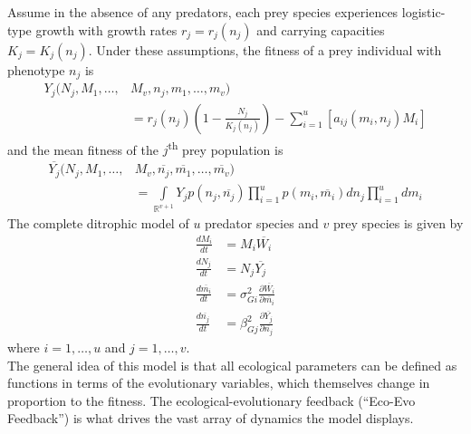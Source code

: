 \documentclass{amsart}
\theoremstyle{definition}
\theoremstyle{remark}
\numberwithin{equation}{section}
\begin{document}
Assume in the absence of any predators, each prey species experiences logistic-type growth with growth rates $r_j = r_j(n_j)$ and carrying capacities $K_j = K_j(n_j)$.  Under these assumptions, the fitness of a prey individual with phenotype $n_j$ is
\begin{equation}
	\label{prey_fitness}
	\begin{aligned}
		Y_j(N_j, M_1, \dots, &M_v, n_j, m_1, \dots, m_v) \\
		&= r_j(n_j)\left(1 - \frac{N_j}{K_j(n_j)}\right) - \sum\limits_{i = 1}^{u}\left[a_{ij}(m_i, n_j)M_i\right]
	\end{aligned}
\end{equation}
and the mean fitness of the $j$\textsuperscript{th} prey population is
\begin{equation}
	\label{avg_prey_fitness}
	\begin{aligned}
		\overline{Y_j}(N_j, M_1, \dots, &M_v, \overline{n_j}, \overline{m_1}, \dots, \overline{m_v}) \\
		&= \int\limits_{\mathbb{R}^{v+1}}^{}Y_jp(n_j, \overline{n_j})\prod\limits_{i = 1}^{u}p(m_i, \overline{m_i})dn_j\prod\limits_{i = 1}^{u}dm_i
	\end{aligned}
\end{equation}
The complete ditrophic model of $u$ predator species and $v$ prey species is given by
\begin{subequations}
	\label{general_model}
	\begin{align}
		\label{eq:general_model_a}
		\frac{dM_i}{dt} &= M_i\overline{W_i} \\[5px]
		\label{eq:general_model_b}
		\frac{dN_j}{dt} &= N_j\overline{Y_j} \\[5px]
		\label{eq:general_model_c}
		\frac{d\overline{m_i}}{dt} &= \sigma_{Gi}^2\frac{\partial \overline{W_i}}{\partial \overline{m_i}} \\[5px]
		\label{eq:general_model_d} 
		\frac{d\overline{n_j}}{dt} &= \beta_{Gj}^2\frac{\partial \overline{Y_j}}{\partial \overline{n_j}}
	\end{align}
\end{subequations}
where $i = 1, \dots, u$ and $j = 1, \dots, v$. \\

The general idea of this model is that all ecological parameters can be defined as functions in terms of the evolutionary variables, which themselves change in proportion to the fitness.  The ecological-evolutionary feedback (``Eco-Evo Feedback'') is what drives the vast array of dynamics the model displays.
\end{document}
